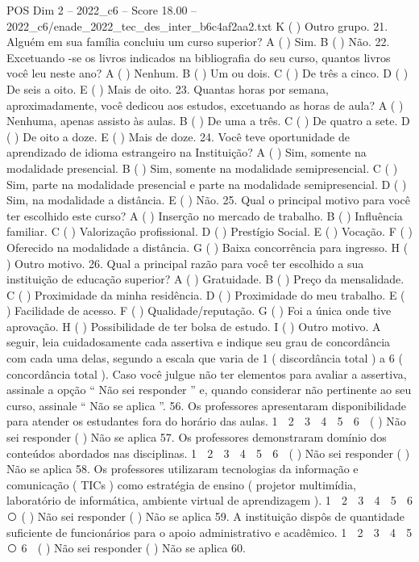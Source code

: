 \begin{textsample}{POS Dim 2 – 2022\_c6 – Score 18.00 – 2022\_c6/enade\_2022\_tec\_des\_inter\_b6c4af2aa2.txt}
K ( ) Outro grupo. 21.
Alguém em sua família concluiu um curso superior?
A ( ) Sim.
B ( ) Não. 22.
Excetuando -se os livros indicados na bibliografia do seu curso, quantos livros você leu neste ano?
A ( ) Nenhum.
B ( ) Um ou dois.
C ( ) De três a cinco.
D ( ) De seis a oito.
E ( ) Mais de oito. 23.
Quantas horas por semana, aproximadamente, você dedicou aos estudos, excetuando as horas de aula?
A ( ) Nenhuma, apenas assisto às aulas.
B ( ) De uma a três.
C ( ) De quatro a sete.
D ( ) De oito a doze.
E ( ) Mais de doze. 24.
Você teve oportunidade de aprendizado de idioma estrangeiro na Instituição?
A ( ) Sim, somente na modalidade presencial.
B ( ) Sim, somente na modalidade semipresencial.
C ( ) Sim, parte na modalidade presencial e parte na modalidade semipresencial.
D ( ) Sim, na modalidade a distância.
E ( ) Não. 25.
Qual o principal motivo para você ter escolhido este curso?
A ( ) Inserção no mercado de trabalho.
B ( ) Influência familiar.
C ( ) Valorização profissional.
D ( ) Prestígio Social.
E ( ) Vocação.
F ( ) Oferecido na modalidade a distância.
G ( ) Baixa concorrência para ingresso.
H ( ) Outro motivo. 26.
Qual a principal razão para você ter escolhido a sua instituição de educação superior?
A ( ) Gratuidade.
B ( ) Preço da mensalidade.
C ( ) Proximidade da minha residência.
D ( ) Proximidade do meu trabalho.
E ( ) Facilidade de acesso.
F ( ) Qualidade/reputação.
G ( ) Foi a única onde tive aprovação.
H ( ) Possibilidade de ter bolsa de estudo.
I ( ) Outro motivo.
A seguir, leia cuidadosamente cada assertiva e indique seu grau de concordância com cada uma delas, segundo a escala que varia de 1 ( discordância total ) a 6 ( concordância total ).
Caso você julgue não ter elementos para avaliar a assertiva, assinale a opção “ Não sei responder ” e, quando considerar não pertinente ao seu curso, assinale “ Não se aplica ”. 56.
Os professores apresentaram disponibilidade para atender os estudantes fora do horário das aulas. 1 ⃝ 2 ⃝ 3 ⃝ 4 ⃝ 5 ⃝ 6 ⃝ ( ) Não sei responder ( ) Não se aplica 57.
Os professores demonstraram domínio dos conteúdos abordados nas disciplinas. 1 ⃝ 2 ⃝ 3 ⃝ 4 ⃝ 5 ⃝ 6 ⃝ ( ) Não sei responder ( ) Não se aplica 58.
Os professores utilizaram tecnologias da informação e comunicação ( TICs ) como estratégia de ensino ( projetor multimídia, laboratório de informática, ambiente virtual de aprendizagem ). 1 ⃝ 2 ⃝ 3 ⃝ 4 ⃝ 5 ⃝ 6 ⃝ ( ) Não sei responder ( ) Não se aplica 59.
A instituição dispôs de quantidade suficiente de funcionários para o apoio administrativo e acadêmico. 1 ⃝ 2 ⃝ 3 ⃝ 4 ⃝ 5 ⃝ 6 ⃝ ( ) Não sei responder ( ) Não se aplica 60.

\end{textsample}
